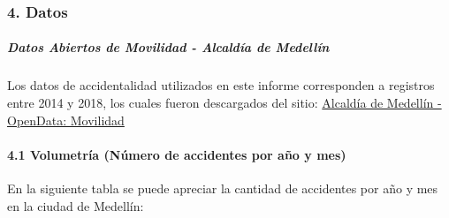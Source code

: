 \documentclass[]{article}
\let\oldparagraph\paragraph
\renewcommand{\paragraph}[1]{\oldparagraph{#1}\mbox{}}
\let\oldsubparagraph\subparagraph
\renewcommand{\subparagraph}[1]{\oldsubparagraph{#1}\mbox{}}
\begin{document}
\hypertarget{datos}{%
\subsubsection{4. Datos}\label{datos}}

\hypertarget{datos-abiertos-de-movilidad---alcaldia-de-medellin}{%
\subparagraph{Datos Abiertos de Movilidad - Alcaldía de
Medellín}\label{datos-abiertos-de-movilidad---alcaldia-de-medellin}}

Los datos de accidentalidad utilizados en este informe corresponden a
registros entre 2014 y 2018, los cuales fueron descargados del sitio:
\href{https://geomedellin-m-medellin.opendata.arcgis.com/search?tags=movilidad}{Alcaldía
de Medellín - OpenData: Movilidad}

\hypertarget{volumetria-numero-de-accidentes-por-ano-y-mes}{%
\paragraph{4.1 Volumetría (Número de accidentes por año y
mes)}\label{volumetria-numero-de-accidentes-por-ano-y-mes}}

En la siguiente tabla se puede apreciar la cantidad de accidentes por
año y mes en la ciudad de Medellín:

\begingroup\fontsize{12}{14}\selectfont
\end{document}
